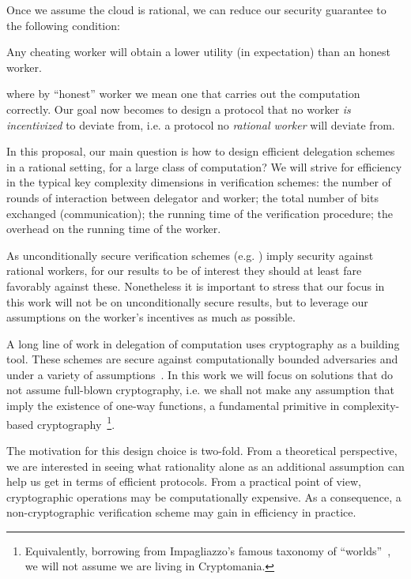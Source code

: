 {Once we assume the cloud is rational, we can reduce our security guarantee to the following condition:
\begin{displayquote}
	Any cheating worker will obtain a lower utility (in expectation) than an honest worker.
\end{displayquote}
 where by ``honest'' worker we mean one that carries out the computation correctly.
Our goal now becomes to design a protocol that no worker \textit{is incentivized} to deviate from, i.e. a protocol no \textit{rational worker} will deviate from. 


In this proposal, our main question is how to design efficient delegation schemes in a rational setting, for a large class of computation? We will strive for efficiency in the typical key complexity dimensions in  verification schemes: the number of rounds of interaction between delegator and worker; the total number of bits exchanged (communication); the running time of the verification procedure; the overhead on the running time of the worker.

As unconditionally secure verification schemes (e.g. \cite{muggles,rrr16})  %
imply security against rational workers, for our results to be of interest they should at least fare favorably against these.
Nonetheless it is important to stress that our focus in this work will not be on unconditionally secure results, but to leverage our assumptions on the worker's incentives as much as possible. 

A long line of work in delegation of computation uses cryptography as a building tool. These schemes are secure against computationally bounded adversaries and under a variety of assumptions~\cite{ggp10,ckv10,qap,pinocchio,kalai2014delegate}.
In this work we will focus on solutions that do not assume full-blown cryptography, i.e. we shall not make any assumption that imply the existence of one-way functions, a fundamental primitive in complexity-based cryptography~\cite{impagliazzo1989one}\footnote{Equivalently, borrowing from  Impagliazzo's famous taxonomy of ``worlds''~\cite{impagliazzo1995personal}, we will not assume we are living in Cryptomania.}.

The motivation for this design choice is two-fold. From a theoretical perspective, we are interested in seeing what rationality alone as an additional assumption can help us get in terms of efficient protocols. From a practical point of view, cryptographic operations may be computationally expensive. As a consequence, a non-cryptographic verification scheme may gain in efficiency in practice.

}
